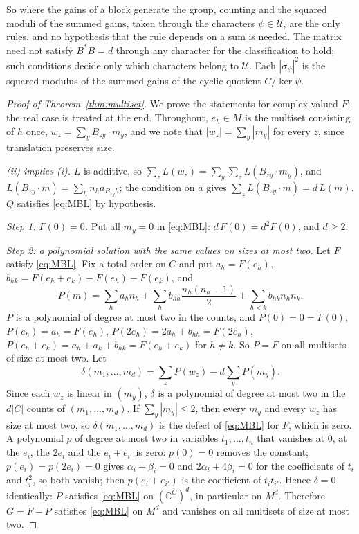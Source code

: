 So where the gains of a block generate the group, counting and the squared moduli of the summed gains, taken through the characters $\psi\in \mathcal{U}$, are the only rules, and no hypothesis that the rule depends on a sum is needed. The matrix need not satisfy $B^*B=d$ through any character for the classification to hold; such conditions decide only which characters belong to $\mathcal{U}$. Each $|\sigma_\psi|^2$ is the squared modulus of the summed gains of the cyclic quotient $C/\ker\psi$.

\begin{proof}[Proof of Theorem~\ref{thm:multiset}]
We prove the statements for complex-valued $F$; the real case is treated at the end. Throughout, $e_h\in M$ is the multiset consisting of $h$ once, $w_z=\sum_yB_{zy}\cdot m_y$, and we note that $|w_z|=\sum_y|m_y|$ for every $z$, since translation preserves size.

\emph{(ii) implies (i).} $L$ is additive, so $\sum_zL(w_z)=\sum_y\sum_zL(B_{zy}\cdot m_y)$, and $L(B_{zy}\cdot m)=\sum_hn_ha_{B_{zy}h}$; the condition on $a$ gives $\sum_zL(B_{zy}\cdot m)=d\,L(m)$. $Q$ satisfies \eqref{eq:MBL} by hypothesis.

\emph{Step 1: $F(0)=0$.} Put all $m_y=0$ in \eqref{eq:MBL}: $d\,F(0)=d^2F(0)$, and $d\ge2$.

\emph{Step 2: a polynomial solution with the same values on sizes at most two.} Let $F$ satisfy \eqref{eq:MBL}. Fix a total order on $C$ and put $a_h=F(e_h)$, $b_{hk}=F(e_h+e_k)-F(e_h)-F(e_k)$, and
\[
P(m)=\sum_ha_hn_h+\sum_hb_{hh}\frac{n_h(n_h-1)}2+\sum_{h<k}b_{hk}n_hn_k .
\]
$P$ is a polynomial of degree at most two in the counts, and $P(0)=0=F(0)$, $P(e_h)=a_h=F(e_h)$, $P(2e_h)=2a_h+b_{hh}=F(2e_h)$, $P(e_h+e_k)=a_h+a_k+b_{hk}=F(e_h+e_k)$ for $h\ne k$. So $P=F$ on all multisets of size at most two. Let
\[
\delta(m_1,\dots,m_d)=\sum_zP(w_z)-d\sum_yP(m_y).
\]
Since each $w_z$ is linear in $(m_y)$, $\delta$ is a polynomial of degree at most two in the $d|C|$ counts of $(m_1,\dots,m_d)$. If $\sum_y|m_y|\le2$, then every $m_y$ and every $w_z$ has size at most two, so $\delta(m_1,\dots,m_d)$ is the defect of \eqref{eq:MBL} for $F$, which is zero. A polynomial $p$ of degree at most two in variables $t_1,\dots,t_n$ that vanishes at $0$, at the $e_i$, the $2e_i$ and the $e_i+e_{i'}$ is zero: $p(0)=0$ removes the constant; $p(e_i)=p(2e_i)=0$ gives $\alpha_i+\beta_i=0$ and $2\alpha_i+4\beta_i=0$ for the coefficients of $t_i$ and $t_i^2$, so both vanish; then $p(e_i+e_{i'})$ is the coefficient of $t_it_{i'}$. Hence $\delta=0$ identically: $P$ satisfies \eqref{eq:MBL} on $(\mathbb{C}^C)^d$, in particular on $M^d$. Therefore $G=F-P$ satisfies \eqref{eq:MBL} on $M^d$ and vanishes on all multisets of size at most two.


\end{proof}
